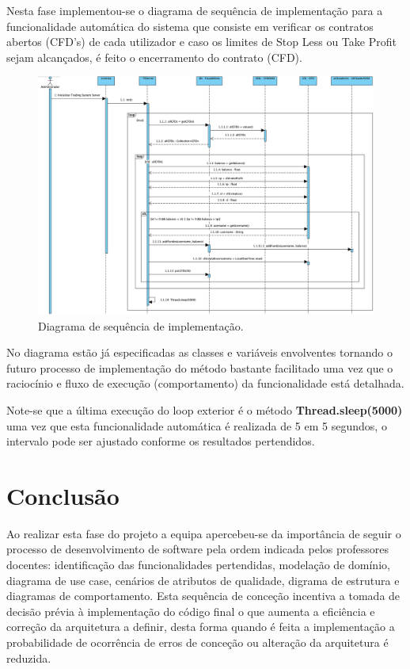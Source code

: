 \documentclass[11pt,a4paper]{report}%
\begin{document}
Nesta fase implementou-se o diagrama de sequência de implementação para a funcionalidade automática do sistema que consiste em verificar os contratos abertos (CFD's) de cada utilizador e caso os limites de Stop Less ou Take Profit sejam alcançados, é feito o encerramento do contrato (CFD).

\begin{figure}[H]
	\centering
	\includegraphics[scale=0.5]{Inicializar_Trading_System_Server.png}
	\caption{Diagrama de sequência de implementação. }
	\label{img:pag}
\end{figure}

No diagrama estão já especificadas as classes e variáveis envolventes tornando o futuro processo de implementação do método bastante facilitado uma vez que o raciocínio e fluxo de execução (comportamento) da funcionalidade está detalhada.

Note-se que a última execução do loop exterior é o método \textbf{Thread.sleep(5000)} uma vez que esta funcionalidade automática é realizada de 5 em 5 segundos, o intervalo pode ser ajustado conforme os resultados pertendidos.  


\newpage

\chapter{Conclusão}

Ao realizar esta fase do projeto a equipa apercebeu-se da importância de seguir o processo de desenvolvimento de software pela ordem indicada pelos professores docentes: identificação das funcionalidades pertendidas, modelação de domínio, diagrama de use case, cenários de atributos de qualidade, digrama de estrutura e diagramas de comportamento. 
Esta sequência de conceção incentiva a tomada de decisão prévia à implementação do código final o que aumenta a eficiência e correção da arquitetura a definir, desta forma quando é feita a implementação a probabilidade de ocorrência de erros de conceção ou alteração da arquitetura é reduzida. 
\end{document}
